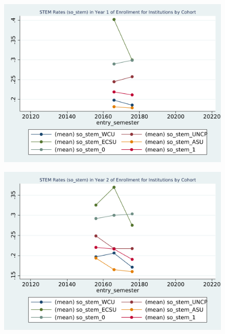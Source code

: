 \begin{figure}[h!]
\begin{centering}
\includegraphics[scale=1]{"figures/so_stem_by_entry_1_INSTITUTION_STEM"}
\end{centering}
\end{figure}
\newpage
\begin{figure}[h!]
\begin{centering}
\includegraphics[scale=1]{"figures/so_stem_by_entry_2_INSTITUTION_STEM"}
\end{centering}
\end{figure}
\newpage
